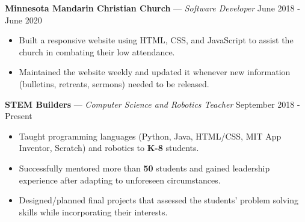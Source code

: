 \documentclass[11pt]{res}
\begin{document}
\begin{footnotesize}
\begin{resume}
\begin{itemize}[leftmargin=6.25mm]
\end{itemize}
\vspace{-2.5mm}
\textbf{Minnesota Mandarin Christian Church} — {\sl Software Developer} \hfill June 2018 - June 2020\vspace{-5mm}
\begin{itemize}[leftmargin=6.25mm] \itemsep -2pt 
\item Built a responsive website using HTML, CSS, and JavaScript to assist the church in combating their low attendance.
\vspace{1.30mm}
\item Maintained the website weekly and updated it whenever new information (bulletins, retreats, sermons) needed to be released. 
\end{itemize}
\vspace{-2.5mm}
\textbf{STEM Builders} — {\sl Computer Science and Robotics Teacher} \hfill September 2018 - Present\vspace{-5mm}
\begin{itemize}[leftmargin=6.25mm] \itemsep -2pt 
\item Taught programming languages (Python, Java, HTML/CSS, MIT App Inventor, Scratch) and robotics to \textbf{K-8} students. 
\vspace{1.30mm}
\item Successfully mentored more than \textbf{50} students and gained leadership experience after adapting to unforeseen circumstances. 
\vspace{1.30mm}
\item Designed/planned final projects that assessed the students' problem solving skills while incorporating their interests.
\end{itemize}
\begin{small}

\end{small}
\end{resume}
\end{footnotesize}
\end{document}
